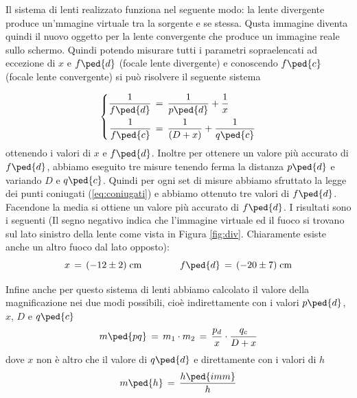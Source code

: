 Il sistema di lenti realizzato funziona nel seguente modo: la lente divergente produce un'mmagine virtuale tra la sorgente e se stessa. Qusta immagine diventa quindi il nuovo oggetto per la lente convergente che produce un immagine reale sullo schermo. Quindi potendo misurare tutti i parametri sopraelencati ad eccezione di $x$ e $f\ped{d}$ (focale lente divergente) e conoscendo $f\ped{c}$ (focale lente convergente) si può risolvere il seguente sistema

\begin{equation}
 \left\{
  \begin{aligned}
    \frac{1}{f\ped{d}} & \,=\, \frac{1}{p\ped{d}} + \frac{1}{x}\\
    \frac{1}{f\ped{c}} & \,=\, \frac{1}{(D + x)} + \frac{1}{q\ped{c}}
  \end{aligned}
\right.
\end{equation}
%
ottenendo i valori di $x$ e $f\ped{d}$. Inoltre per ottenere un valore più accurato di $f\ped{d}$, abbiamo eseguito tre misure tenendo ferma la distanza $p\ped{d}$ e variando $D$ e $q\ped{c}$. Quindi per ogni set di misure abbiamo sfruttato la legge dei punti coniugati (\ref{eq:coniugati}) e abbiamo ottenuto tre valori di $f\ped{d}$. Facendone la media si ottiene un valore più accurato di $f\ped{d}$. I risultati sono i seguenti (Il segno negativo indica che l'immagine virtuale ed il fuoco si trovano sul lato sinistro della lente come vista in Figura \ref{fig:div}. Chiaramente esiste anche un altro fuoco dal lato opposto):
\begin{equation}
	x \,=\, (-12 \pm 2) \;\si{\centi\metre} \qquad \qquad f\ped{d} \,=\, (-20 \pm 7) \;\si{\centi\metre}
\end{equation}

Infine anche per questo sistema di lenti abbiamo calcolato il valore della magnificazione nei due modi possibili, cioè indirettamente con i valori $p\ped{d}$, $x$, $D$ e $q\ped{c}$
\begin{equation}
    m\ped{pq} \,=\, m_1 \cdot m_2 \,=\, \frac{p_d}{x} \cdot \frac{q_c}{D+x}
\end{equation} %
dove $x$ non è altro che il valore di $q\ped{d}$ e direttamente con i valori di $h$
\begin{equation}
    m\ped{h} \,=\, \frac{h\ped{imm}}{h}
\end{equation}

